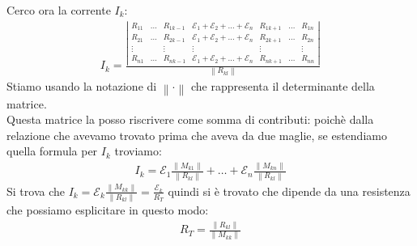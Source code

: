 \documentclass[a4paper, oneside]{article}
\begin{document}
Cerco ora la corrente $I_k$:
\begin{gather*}
    I_k = \frac{\left\lvert \begin{matrix}
        R_{11} & \dots & R_{1k-1} & \mathcal{E}_1 + \mathcal{E}_2 + \dots + \mathcal{E}_n & R_{1k+1} & \dots & R_{1n}\\
        R_{21} & \dots & R_{2k-1} & \mathcal{E}_1 + \mathcal{E}_2 + \dots + \mathcal{E}_n & R_{2k+1} & \dots & R_{2n}\\
        \vdots &  & \vdots & \vdots & \vdots &  & \vdots\\
        R_{n1} & \dots & R_{nk-1} & \mathcal{E}_1 + \mathcal{E}_2 + \dots + \mathcal{E}_n & R_{nk+1} & \dots & R_{nn}
    \end{matrix} \right\rvert }{\left\lVert R_{kl}\right\rVert }
\end{gather*}
Stiamo usando la notazione di $\left\lVert \cdot \right\rVert$ che rappresenta il determinante della matrice.\\
Questa matrice la posso riscrivere come somma di contributi: poichè dalla relazione che avevamo trovato prima che aveva da due maglie, se estendiamo quella formula per $I_k$ troviamo:
\begin{gather*}
    I_k = \mathcal{E}_1 \frac{\left\lVert M_{k1} \right\rVert }{\left\lVert R_{kl}\right\rVert } + \dots + \mathcal{E}_n \frac{\left\lVert M_{kn} \right\rVert }{\left\lVert R_{kl} \right\rVert }
\end{gather*}
Si trova che $I_k = \mathcal{E}_k \frac{\left\lVert M_{kk} \right\rVert }{\left\lVert R_{kl} \right\rVert } = \frac{\mathcal{E}_k}{R_T}$ quindi si è trovato che dipende da una resistenza che possiamo esplicitare in questo modo:
\begin{gather*}
    R_T = \frac{\left\lVert R_{kl} \right\rVert }{\left\lVert M_{kk} \right\rVert }
\end{gather*}
\end{document}
